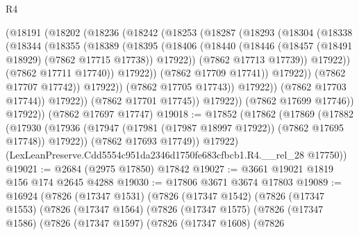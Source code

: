 \begin{lexlean}{R4}
\begin{coremodule}
                        (@18191
                          (@18202
                            (@18236
                              (@18242
                                (@18253
                                  (@18287
                                    (@18293
                                      (@18304
                                        (@18338
                                          (@18344
                                            (@18355
                                              (@18389
                                                (@18395
                                                  (@18406
                                                    (@18440
                                                      (@18446
                                                        (@18457
                                                          (@18491 @18929)
                                                          (@7862 @17715 @17738))
                                                        @17922))
                                                    (@7862 @17713 @17739))
                                                  @17922))
                                              (@7862 @17711 @17740))
                                            @17922))
                                        (@7862 @17709 @17741))
                                      @17922))
                                  (@7862 @17707 @17742))
                                @17922))
                            (@7862 @17705 @17743))
                          @17922))
                      (@7862 @17703 @17744))
                    @17922))
                (@7862 @17701 @17745))
              @17922))
          (@7862 @17699 @17746))
        @17922))
    (@7862 @17697 @17747)
@19018 := @17852
    (@17862
      (@17869
        (@17882
          (@17930 (@17936 (@17947 (@17981 (@17987 @18997 @17922)) (@7862 @17695 @17748)) @17922))
          (@7862 @17693 @17749))
        @17922)
      (LexLeanPreserve.Cdd5554c951da2346d1750fe683cfbcb1.R4.__rel_28 @17750))
@19021 := @2684 (@2975 @17850) @17842
@19027 := @3661 @19021 @1819 @156 @174 @2645 @4288
@19030 := @17806 @3671 @3674 @17803
@19089 := @16924
    (@7826
      (@17347 @1531)
      (@7826
        (@17347 @1542)
        (@7826
          (@17347 @1553)
          (@7826
            (@17347 @1564)
            (@7826
              (@17347 @1575)
              (@7826
                (@17347 @1586)
                (@7826
                  (@17347 @1597)
                  (@7826
                    (@17347 @1608)
                    (@7826

\end{coremodule}
\end{lexlean}
